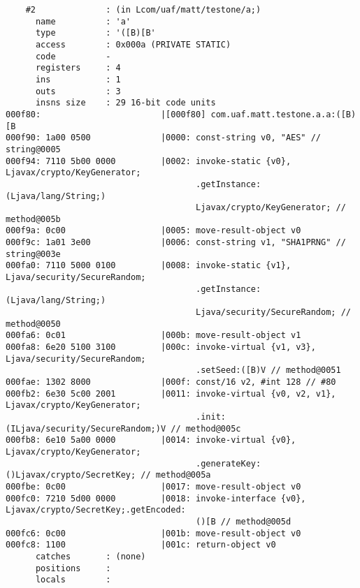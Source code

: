 \begin{lstlisting}
    #2              : (in Lcom/uaf/matt/testone/a;)
      name          : 'a'
      type          : '([B)[B'
      access        : 0x000a (PRIVATE STATIC)
      code          -
      registers     : 4
      ins           : 1
      outs          : 3
      insns size    : 29 16-bit code units
000f80:                        |[000f80] com.uaf.matt.testone.a.a:([B)[B
000f90: 1a00 0500              |0000: const-string v0, "AES" // string@0005
000f94: 7110 5b00 0000         |0002: invoke-static {v0}, Ljavax/crypto/KeyGenerator;
                                      .getInstance:(Ljava/lang/String;)
                                      Ljavax/crypto/KeyGenerator; // method@005b
000f9a: 0c00                   |0005: move-result-object v0
000f9c: 1a01 3e00              |0006: const-string v1, "SHA1PRNG" // string@003e
000fa0: 7110 5000 0100         |0008: invoke-static {v1}, Ljava/security/SecureRandom;
                                      .getInstance:(Ljava/lang/String;)
                                      Ljava/security/SecureRandom; // method@0050
000fa6: 0c01                   |000b: move-result-object v1
000fa8: 6e20 5100 3100         |000c: invoke-virtual {v1, v3}, Ljava/security/SecureRandom;
                                      .setSeed:([B)V // method@0051
000fae: 1302 8000              |000f: const/16 v2, #int 128 // #80
000fb2: 6e30 5c00 2001         |0011: invoke-virtual {v0, v2, v1}, Ljavax/crypto/KeyGenerator;
                                      .init:(ILjava/security/SecureRandom;)V // method@005c
000fb8: 6e10 5a00 0000         |0014: invoke-virtual {v0}, Ljavax/crypto/KeyGenerator;
                                      .generateKey:()Ljavax/crypto/SecretKey; // method@005a
000fbe: 0c00                   |0017: move-result-object v0
000fc0: 7210 5d00 0000         |0018: invoke-interface {v0}, Ljavax/crypto/SecretKey;.getEncoded:
                                      ()[B // method@005d
000fc6: 0c00                   |001b: move-result-object v0
000fc8: 1100                   |001c: return-object v0
      catches       : (none)
      positions     :
      locals        :


\end{lstlisting}
